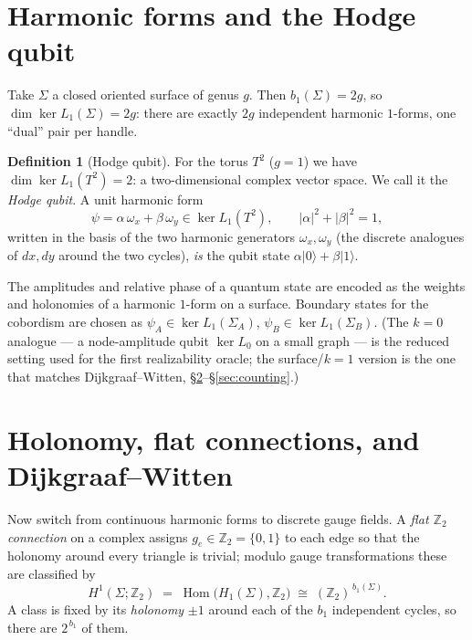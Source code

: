 \documentclass[11pt]{article}
\theoremstyle{plain}
\theoremstyle{definition}
\newtheorem{definition}{Definition}
\theoremstyle{remark}
\newcommand{\Z}{\mathbb{Z}}
\newcommand{\ket}[1]{\lvert #1 \rangle}
\begin{document}
\section{Harmonic forms and the Hodge qubit}\label{sec:qubit}

Take $\Sigma$ a closed oriented surface of genus $g$. Then
$b_1(\Sigma) = 2g$, so $\dim \ker L_1(\Sigma) = 2g$: there are exactly $2g$
independent harmonic $1$-forms, one ``dual'' pair per handle.

\begin{definition}[Hodge qubit]
For the torus $T^2$ ($g=1$) we have $\dim\ker L_1(T^2) = 2$: a two-dimensional
complex vector space. We call it the \emph{Hodge qubit}. A unit harmonic form
\begin{equation}
\psi = \alpha\,\omega_x + \beta\,\omega_y \in \ker L_1(T^2),
\qquad \lvert\alpha\rvert^2 + \lvert\beta\rvert^2 = 1,
\end{equation}
written in the basis of the two harmonic generators $\omega_x,\omega_y$ (the
discrete analogues of $dx, dy$ around the two cycles), \emph{is} the qubit state
$\alpha\ket{0} + \beta\ket{1}$.
\end{definition}

The amplitudes and relative phase of a quantum state are encoded as the
weights and holonomies of a harmonic $1$-form on a surface. Boundary states for
the cobordism are chosen as $\psi_A \in \ker L_1(\Sigma_A)$,
$\psi_B \in \ker L_1(\Sigma_B)$. (The $k=0$ analogue --- a node-amplitude qubit
$\ker L_0$ on a small graph --- is the reduced setting used for the first
realizability oracle; the surface/$k{=}1$ version is the one that matches
Dijkgraaf--Witten, \S\ref{sec:dw}--\S\ref{sec:counting}.)

\section{Holonomy, flat connections, and Dijkgraaf--Witten}\label{sec:dw}

Now switch from continuous harmonic forms to discrete gauge fields. A
\emph{flat $\Z_2$ connection} on a complex assigns $g_e \in \Z_2 = \{0,1\}$ to
each edge so that the holonomy around every triangle is trivial; modulo gauge
transformations these are classified by
\begin{equation}
H^1(\Sigma;\Z_2) \;=\; \operatorname{Hom}\!\big(H_1(\Sigma),\Z_2\big)
\;\cong\; (\Z_2)^{\,b_1(\Sigma)} .
\end{equation}
A class is fixed by its \emph{holonomy} $\pm 1$ around each of the $b_1$
independent cycles, so there are $2^{\,b_1}$ of them.
\end{document}
